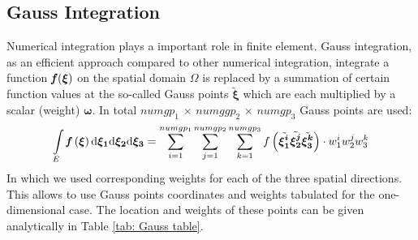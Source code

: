 \subsection{Gauss Integration}
Numerical integration plays a important role in finite element. Gauss integration, as an efficient approach compared to other numerical integration, integrate a function $\textbf{\textit{f}}(\boldsymbol{\xi})$ on the spatial domain $\Omega$ is replaced by a summation of certain function values at the so-called Gauss points $\tilde{\boldsymbol{\xi}}$ which are each multiplied by a scalar (weight) $\boldsymbol{\omega}$.  In total $numgp_1$ $\times$ $numggp_2$ $\times$ $numgp_3$ Gauss points are used:
\begin{equation}
\int \limits_E {\textbf{\textit{f}}} \left(\boldsymbol{\xi}\right) \mathrm{d\boldsymbol{\xi_1}}\mathrm{d\boldsymbol{\xi_2}}\mathrm{d\boldsymbol{\xi_3}} = \displaystyle\sum_{i=1}^{numgp_1}\displaystyle\sum_{j=1}^{numgp_2} \displaystyle\sum_{k=1}^{numgp_3} f\left(\tilde{\boldsymbol{\xi_1^i}}\tilde{\boldsymbol{\xi_2^j}}\tilde{\boldsymbol{\xi_3^k}}\right)\cdot w_1^i w_2^j w_3^k
\end{equation}
In which we used corresponding weights for each of the three spatial directions. This allows to use Gauss points coordinates and weights tabulated for the one-dimensional case. The location and weights of these points can be given analytically in Table \ref{tab: Gauss table}.
	
